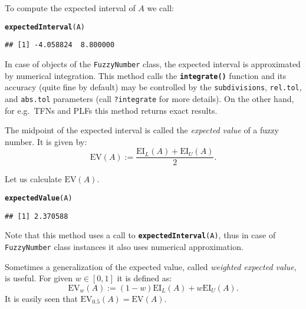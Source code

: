 \documentclass[11pt]{article}\usepackage[]{graphicx}\usepackage[]{color}
\makeatletter
\newcommand{\hlstd}[1]{\textcolor[rgb]{0.345,0.345,0.345}{#1}}%
\newcommand{\hlkwc}[1]{\textcolor[rgb]{0.333,0.667,0.333}{#1}}%
\newcommand{\hlkwd}[1]{\textcolor[rgb]{0.737,0.353,0.396}{\textbf{#1}}}%
\newenvironment{kframe}{%
 \def\at@end@of@kframe{}%
 \ifinner\ifhmode%
  \def\at@end@of@kframe{\end{minipage}}%
  \begin{minipage}{\columnwidth}%
 \fi\fi%
 \def\FrameCommand##1{\hskip\@totalleftmargin \hskip-\fboxsep
 \colorbox{shadecolor}{##1}\hskip-\fboxsep
     \hskip-\linewidth \hskip-\@totalleftmargin \hskip\columnwidth}%
 \MakeFramed {\advance\hsize-\width
   \@totalleftmargin\z@ \linewidth\hsize
   \@setminipage}}%
 {\par\unskip\endMakeFramed%
 \at@end@of@kframe}
\newenvironment{knitrout}{}{} %
\newcommand{\func}[1]{\texttt{\hlkwd{#1}}}
\newcommand{\argument}[1]{\texttt{\hlkwc{#1}}}
\makeatother
\begin{document}
\noindent
To compute the expected interval of $A$ we call:

\begin{knitrout}\small
{}\color{fgcolor}\begin{kframe}
\begin{alltt}
\hlkwd{expectedInterval}\hlstd{(A)}
\end{alltt}
\begin{verbatim}
## [1] -4.058824  8.800000
\end{verbatim}
\end{kframe}
\end{knitrout}

\noindent
In case of objects of
the \texttt{FuzzyNumber} class, the expected interval is approximated
by numerical integration. This method calls the \func{integrate()} function
and its accuracy (quite fine by default)
may be controlled by the \argument{subdivisions},
\argument{rel.tol}, and \argument{abs.tol} parameters
(call \texttt{?integrate} for more details).
On the other hand, for e.g.~TFNs and PLFs this method returns exact results.

\bigskip
The midpoint of the expected interval is called the \textit{expected value}
of a fuzzy number. It is given by:
\begin{equation}
\mathrm{EV}(A) := \frac{\mathrm{EI}_L(A) + \mathrm{EI}_U(A)}{2}.
\end{equation}

\noindent
Let us calculate $\mathrm{EV}(A)$.

\begin{knitrout}\small
{}\color{fgcolor}\begin{kframe}
\begin{alltt}
\hlkwd{expectedValue}\hlstd{(A)}
\end{alltt}
\begin{verbatim}
## [1] 2.370588
\end{verbatim}
\end{kframe}
\end{knitrout}

\noindent
Note that this method uses a call to \texttt{\func{expectedInterval}(A)},
thus in case of \texttt{FuzzyNumber} class instances it also uses
numerical approximation.

Sometimes a generalization of the expected value,
called \textit{weighted expected value}, is useful.
For given $w\in[0,1]$ it is defined as:
\begin{equation}
\mathrm{EV}_w(A) := (1-w)\mathrm{EI}_L(A) + w\mathrm{EI}_U(A).
\end{equation}
It is easily seen that $\mathrm{EV}_{0.5}(A)=\mathrm{EV}(A)$.
\end{document}
